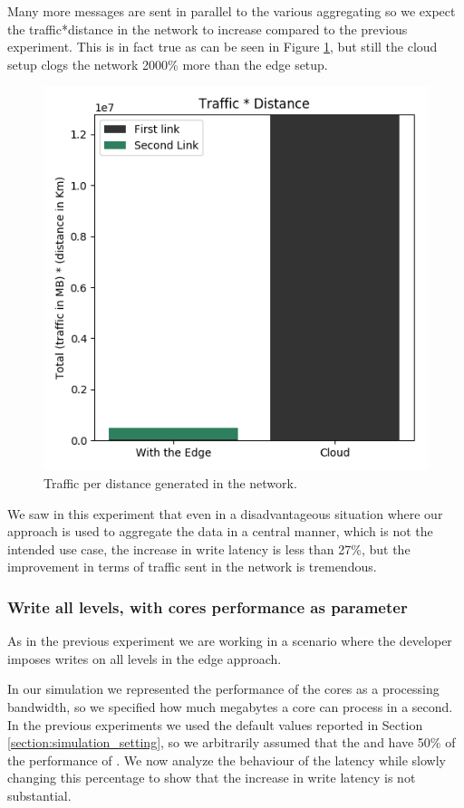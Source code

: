 Many more messages are sent in parallel to the various aggregating  so we expect the traffic*distance in the network to increase compared to the previous experiment. This is in fact true as can be seen in Figure \ref{fig:write-all-traffic1}, but still the cloud setup clogs the network 2000\% more than the edge setup.

\begin{figure}[H]
    \centering
    \includegraphics[width=0.75\linewidth]{Figures/Evaluation/write-all-traffic1.png}
    \caption{Traffic per distance generated in the network.}
    \label{fig:write-all-traffic1}
\end{figure}

We saw in this experiment that even in a disadvantageous situation where our approach is used to aggregate the data in a central manner, which is not the intended use case, the increase in write latency is less than 27\%, but the improvement in terms of traffic sent in the network is tremendous.


\subsubsection{Write all levels, with cores performance as parameter}
As in the previous experiment we are working in a scenario where the developer imposes writes on all levels in the edge approach.

In our simulation we represented the performance of the cores as a processing bandwidth, so we specified how much megabytes a core can process in a second. In the previous experiments we used the default values reported in Section \ref{section:simulation_setting}, so we arbitrarily assumed that the  and  have 50\% of the performance of . We now analyze the behaviour of the latency while slowly changing this percentage to show that the increase in write latency is not substantial.

